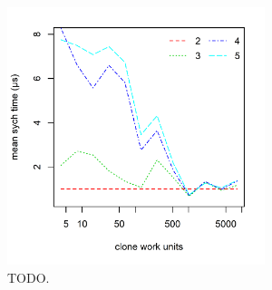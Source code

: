 \begin{figure}
	\centering
	\includegraphics[width=0.67\textwidth]{experiments/clone_compete_2.png}
	\caption[TODO]{TODO.}
	\label{fig:clone_compete_3}
\end{figure}


